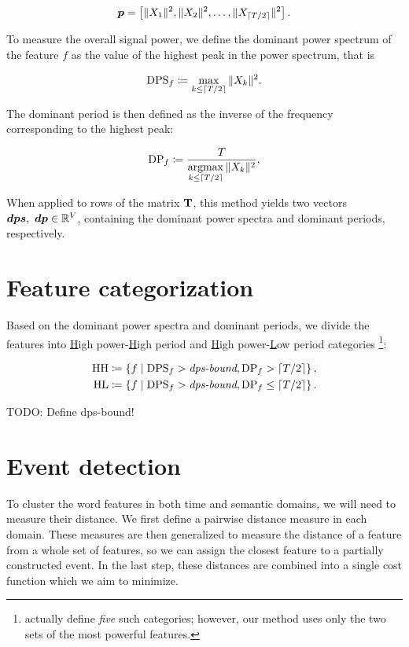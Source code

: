 \begin{equation*}
	\vect{P} = \left[ \|X_{1}\|^{2}, \|X_{2}\|^{2}, \dots, \|X_{\ceil{\streamlen / 2}}\|^{2} \right].
\end{equation*}

To measure the overall signal power, we define the dominant power spectrum of the feature $f$ as the value of the highest peak in the power spectrum, that is

\begin{equation}
	\text{DPS}_{f} \coloneqq \max\limits_{k \leq \lceil T / 2\rceil}{\|X_{k}\|^{2}}.
\end{equation}

The dominant period is then defined as the inverse of the frequency corresponding to the highest peak:

\begin{equation}
	\text{DP}_{f} \coloneqq \frac{T}{\operatorname*{argmax}\limits_{k \leq \lceil T / 2\rceil}{\|X_{k}\|^{2}}},
\end{equation}

When applied to rows of the matrix $\mathbf{T}$, this method yields two vectors $\vect{DPS},\ \vect{DP} \in \R^{\featcount}$, containing the dominant power spectra and dominant periods, respectively.


\section{Feature categorization}
Based on the dominant power spectra and dominant periods, we divide the features into \underline{H}igh power-\underline{H}igh period and \underline{H}igh power-\underline{L}ow period categories \footnote{\cite{event-detection} actually define \textit{five} such categories; however, our method uses only the two sets of the most powerful features.}:

\begin{equation}
\begin{split}
	\text{HH} \coloneqq \left\{ f \mid \text{DPS}_{f} > \textit{dps-bound}, \text{DP}_{f} > \lceil T / 2\rceil \right\}, \\
	\text{HL} \coloneqq \left\{ f \mid \text{DPS}_{f} > \textit{dps-bound}, \text{DP}_{f} \leq \lceil T / 2\rceil \right\}.
\end{split}
\end{equation}

{\color{red}TODO: Define dps-bound!}


\section{Event detection}
To cluster the word features in both time and semantic domains, we will need to measure their distance. We first define a pairwise distance measure in each domain. These measures are then generalized to measure the distance of a feature from a whole set of features, so we can assign the closest feature to a partially constructed event. In the last step, these distances are combined into a single cost function which we aim to minimize.


